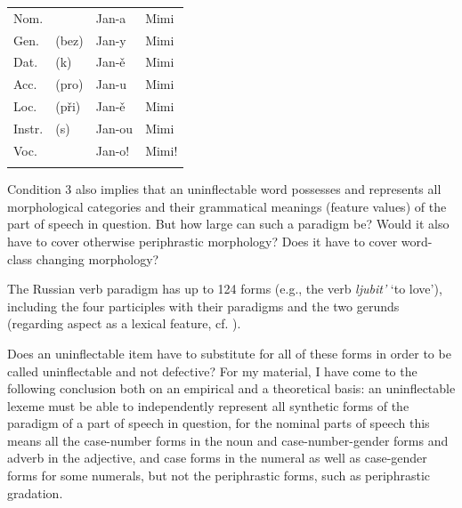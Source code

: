 \documentclass[output=paper]{langscibook}
\begin{document}
\begin{tabularx}{\textwidth}{XXXX}

\lsptoprule

Nom. &  & Jan-a & Mimi\\
Gen. & (bez) & Jan-y & Mimi\\
Dat. & (k) & Jan{}-ě & Mimi\\
Acc. & (pro) & Jan-u & Mimi\\
Loc. & (při) & Jan-ě & Mimi\\
Instr. & (s) & Jan-ou & Mimi\\
Voc. &  & Jan-o! & Mimi!\\
\lspbottomrule
\end{tabularx}
\begin{table}
\caption{inflectable and uninflectable name in Czech}
\label{tab:key:3}
\end{table}

Condition 3 also implies that an uninflectable word possesses and represents all morphological categories and their grammatical meanings (feature values) of the part of speech in question. But how large can such a paradigm be?  Would it also have to cover otherwise periphrastic morphology? Does it have to cover word-class changing morphology? 

The Russian verb paradigm has up to 124 forms (e.g., the verb \textit{ljubit’} ‘to love’), including the four participles with their paradigms and the two gerunds (regarding aspect as a lexical feature, cf. \citealt{Genis2021}).

Does an uninflectable item have to substitute for all of these forms in order to be called uninflectable and not defective? For my material, I have come to the following conclusion both on an empirical and a theoretical basis: an uninflectable lexeme must be able to independently represent all synthetic forms of the paradigm of a part of speech in question, for the nominal parts of speech this means all the case-number forms in the noun and case-number-gender forms and adverb in the adjective, and case forms in the numeral as well as case-gender forms for some numerals, but not the periphrastic forms, such as periphrastic gradation.
\end{document}
